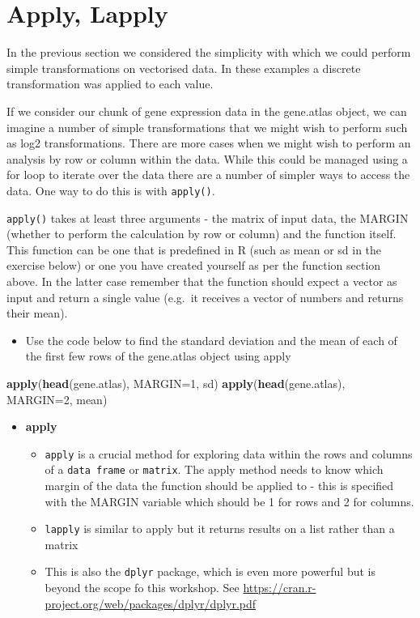 \documentclass[a4paper]{book}
\newenvironment{Shaded}{\begin{snugshade}}{\end{snugshade}}
\newcommand{\KeywordTok}[1]{\textcolor[rgb]{0.13,0.29,0.53}{\textbf{{#1}}}}
\newcommand{\DataTypeTok}[1]{\textcolor[rgb]{0.13,0.29,0.53}{{#1}}}
\newcommand{\DecValTok}[1]{\textcolor[rgb]{0.00,0.00,0.81}{{#1}}}
\newcommand{\NormalTok}[1]{{#1}}
\renewenvironment{Shaded}
{\vspace{1.5em}\begin{leftbar}\begin{snugshade}}
{\end{snugshade}\end{leftbar}\vspace{3pt}}
\newenvironment{rmdblock}[1]
  {\vspace{1.5em}\begin{shaded*}
  \begin{itemize}
  \renewcommand{\labelitemi}{
    \raisebox{-.7\height}[0pt][0pt]{
      {\setkeys{Gin}{width=3em,keepaspectratio}\texttt{[image: images/\#1]}}
    }
  }
  \item
  }
  {
  \end{itemize}
  \end{shaded*}
  }
\newenvironment{rmdtip}
  {\begin{rmdblock}{tip}}
  {\end{rmdblock}}
\newenvironment{rmdexercise}
  {\begin{rmdblock}{exercise}}
  {\end{rmdblock}}
\begin{document}
\section{Apply, Lapply}\label{apply-lapply}

In the previous section we considered the simplicity with which we could
perform simple transformations on vectorised data. In these examples a
discrete transformation was applied to each value.

If we consider our chunk of gene expression data in the gene.atlas
object, we can imagine a number of simple transformations that we might
wish to perform such as log2 transformations. There are more cases when
we might wish to perform an analysis by row or column within the data.
While this could be managed using a for loop to iterate over the data
there are a number of simpler ways to access the data. One way to do
this is with \texttt{apply()}.

\texttt{apply()} takes at least three arguments - the matrix of input
data, the MARGIN (whether to perform the calculation by row or column)
and the function itself. This function can be one that is predefined in
R (such as mean or sd in the exercise below) or one you have created
yourself as per the function section above. In the latter case remember
that the function should expect a vector as input and return a single
value (e.g.~it receives a vector of numbers and returns their mean).

\begin{rmdexercise}
Use the code below to find the standard deviation and the mean of each
of the first few rows of the gene.atlas object using apply
\end{rmdexercise}

\begin{Shaded}
\begin{Highlighting}[]
\KeywordTok{apply}\NormalTok{(}\KeywordTok{head}\NormalTok{(gene.atlas), }\DataTypeTok{MARGIN=}\DecValTok{1}\NormalTok{, sd)}
\KeywordTok{apply}\NormalTok{(}\KeywordTok{head}\NormalTok{(gene.atlas), }\DataTypeTok{MARGIN=}\DecValTok{2}\NormalTok{, mean)}
\end{Highlighting}
\end{Shaded}

\begin{rmdtip}
\textbf{apply}

\begin{itemize}
\item
  \texttt{apply} is a crucial method for exploring data within the rows
  and columns of a \texttt{data\ frame} or \texttt{matrix}. The apply
  method needs to know which margin of the data the function should be
  applied to - this is specified with the MARGIN variable which should
  be 1 for rows and 2 for columns.
\item
  \texttt{lapply} is similar to apply but it returns results on a list
  rather than a matrix
\item
  This is also the \texttt{dplyr} package, which is even more powerful
  but is beyond the scope fo this workshop. See
  \url{https://cran.r-project.org/web/packages/dplyr/dplyr.pdf}
\end{itemize}
\end{rmdtip}
\end{document}
